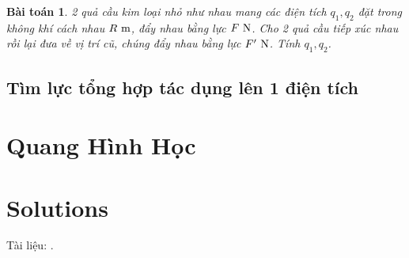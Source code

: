 \documentclass{article}
\numberwithin{equation}{section}
\newtheorem{baitoan}{Bài toán}[section]
\begin{document}
\begin{baitoan}
	2 quả cầu kim loại nhỏ như nhau mang các điện tích $q_1,q_2$ đặt trong không khí cách nhau $R\ {\rm m}$, đẩy nhau bằng lực $F\ {\rm N}$. Cho 2 quả cầu tiếp xúc nhau rồi lại đưa về vị trí cũ, chúng đẩy nhau bằng lực $F'\ {\rm N}$. Tính $q_1,q_2$.
\end{baitoan}

\subsection{Tìm lực tổng hợp tác dụng lên 1 điện tích}


\section{Quang Hình Học}


\section{Solutions}


Tài liệu: \cite{SGK_Hoa_Hoc_11_co_ban, SGK_Hoa_Hoc_11_nang_cao}.

\printbibliography[heading=bibintoc]
	
\end{document}
